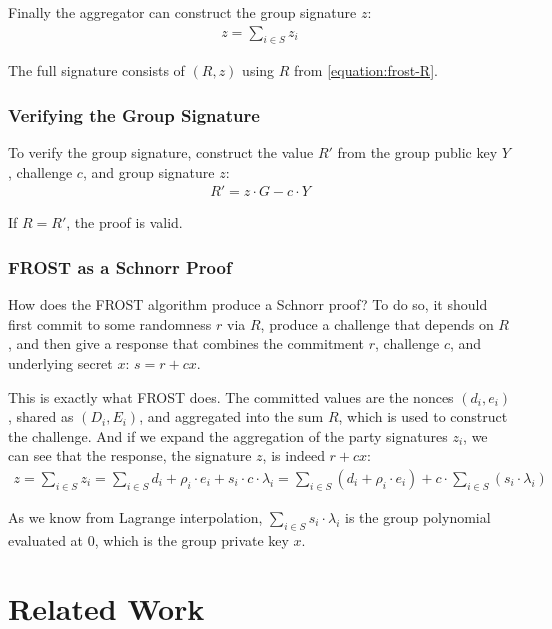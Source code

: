 \documentclass{article}
\theoremstyle{plain}
\theoremstyle{definition}
\theoremstyle{remark}
\begin{document}
Finally the aggregator can construct the group signature $z$:
\begin{align}\label{equation:frost-z-sum}
  z = \sum_{i \in S}^{} z_i
\end{align}

The full signature consists of $(R, z)$ using $R$ from \eqref{equation:frost-R}.

\subsubsection{
  Verifying the Group Signature
}

To verify the group signature, construct the value $R'$ from the group public key $Y$, challenge $c$, and group signature $z$:
\begin{align}\label{equation:frost-verify}
  R' = z \cdot G - c \cdot Y
\end{align}

If $R = R'$, the proof is valid.

\subsubsection{
  FROST as a Schnorr Proof
}\label{section:frost-schnorr}

How does the FROST algorithm produce a Schnorr proof?  To do so, it should first commit to some randomness $r$ via $R$, produce a challenge that depends on $R$, and then give a response that combines the commitment $r$, challenge $c$, and underlying secret $x$: $s = r + cx$.

This is exactly what FROST does.  The committed values are the nonces $(d_i, e_i)$, shared as $(D_i, E_i)$, and aggregated into the sum $R$, which is used to construct the challenge.  And if we expand the aggregation of the party signatures $z_i$, we can see that the response, the signature $z$, is indeed $r + cx$:
\begin{align}
  z = \sum_{i \in S}^{} z_i = \sum_{i \in S}^{} d_i + \rho_i \cdot e_i + s_i \cdot c \cdot \lambda_i = \sum_{i \in S}^{} (d_i + \rho_i \cdot e_i) + c \cdot \sum_{i \in S}^{}(s_i \cdot \lambda_i)\nonumber
\end{align}

As we know from Lagrange interpolation, $\sum_{i \in S}^{} s_i \cdot \lambda_i$ is the group polynomial evaluated at $0$, which is the group private key $x$.

\newpage
\onecolumn
\section{
  Related Work
}
\end{document}
